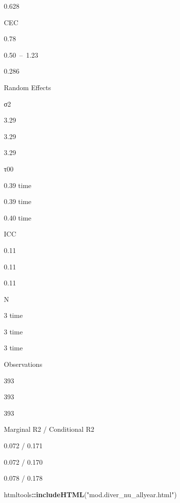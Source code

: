 \documentclass[
]{article}
\newenvironment{Shaded}{\begin{snugshade}}{\end{snugshade}}
\newcommand{\FunctionTok}[1]{\textcolor[rgb]{0.13,0.29,0.53}{\textbf{#1}}}
\newcommand{\NormalTok}[1]{#1}
\newcommand{\SpecialCharTok}[1]{\textcolor[rgb]{0.81,0.36,0.00}{\textbf{#1}}}
\newcommand{\StringTok}[1]{\textcolor[rgb]{0.31,0.60,0.02}{#1}}
\begin{document}
0.628

CEC

0.78

0.50~--~1.23

0.286

Random Effects

σ2

3.29

3.29

3.29

τ00

0.39 time

0.39 time

0.40 time

ICC

0.11

0.11

0.11

N

3 time

3 time

3 time

Observations

393

393

393

Marginal R2 / Conditional R2

0.072 / 0.171

0.072 / 0.170

0.078 / 0.178

\begin{Shaded}
\begin{Highlighting}[]
\NormalTok{htmltools}\SpecialCharTok{::}\FunctionTok{includeHTML}\NormalTok{(}\StringTok{"mod.diver\_nu\_allyear.html"}\NormalTok{)}
\end{Highlighting}
\end{Shaded}
\end{document}

